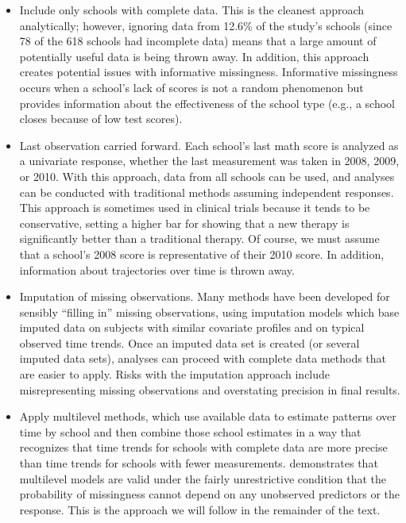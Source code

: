 \documentclass[
]{krantz}
\providecommand{\tightlist}{%
  \setlength{\itemsep}{0pt}\setlength{\parskip}{0pt}}
\begin{document}
\begin{itemize}
\tightlist
\item
  Include only schools with complete data. This is the cleanest approach analytically; however, ignoring data from 12.6\% of the study's schools (since 78 of the 618 schools had incomplete data) means that a large amount of potentially useful data is being thrown away. In addition, this approach creates potential issues with informative missingness. Informative missingness occurs when a school's lack of scores is not a random phenomenon but provides information about the effectiveness of the school type (e.g., a school closes because of low test scores).
\item
  Last observation carried forward. Each school's last math score is analyzed as a univariate response, whether the last measurement was taken in 2008, 2009, or 2010. With this approach, data from all schools can be used, and analyses can be conducted with traditional methods assuming independent responses. This approach is sometimes used in clinical trials because it tends to be conservative, setting a higher bar for showing that a new therapy is significantly better than a traditional therapy. Of course, we must assume that a school's 2008 score is representative of their 2010 score. In addition, information about trajectories over time is thrown away.
\item
  Imputation of missing observations. Many methods have been developed for sensibly ``filling in'' missing observations, using imputation models which base imputed data on subjects with similar covariate profiles and on typical observed time trends. Once an imputed data set is created (or several imputed data sets), analyses can proceed with complete data methods that are easier to apply. Risks with the imputation approach include misrepresenting missing observations and overstating precision in final results.
\item
  Apply multilevel methods, which use available data to estimate patterns over time by school and then combine those school estimates in a way that recognizes that time trends for schools with complete data are more precise than time trends for schools with fewer measurements. \citet{Laird1988} demonstrates that multilevel models are valid under the fairly unrestrictive condition that the probability of missingness cannot depend on any unobserved predictors or the response. This is the approach we will follow in the remainder of the text.
\end{itemize}
\end{document}
